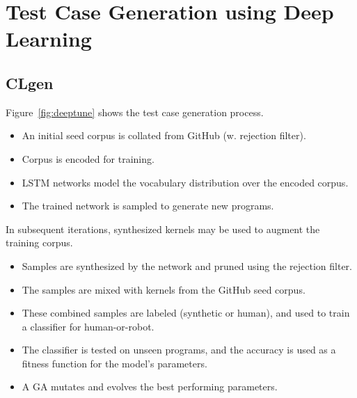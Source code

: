 \section{Test Case Generation using Deep Learning}

\subsection{CLgen}

Figure~\ref{fig:deeptune} shows the test case generation process.

\begin{itemize}
\item An initial seed corpus is collated from GitHub (w. rejection filter).
\item Corpus is encoded for training.
\item LSTM networks model the vocabulary distribution over the encoded corpus.
\item The trained network is sampled to generate new programs.
\end{itemize}

\noindent In subsequent iterations, synthesized kernels may be used to augment the training corpus.

\begin{itemize}
\item Samples are synthesized by the network and pruned using the rejection filter.
\item The samples are mixed with kernels from the GitHub seed corpus.
\item These combined samples are labeled (synthetic or human), and used to train a classifier for human-or-robot.
\item The classifier is tested on unseen programs, and the accuracy is used as a fitness function for the model's parameters.
\item A GA mutates and evolves the best performing parameters.
\end{itemize}


